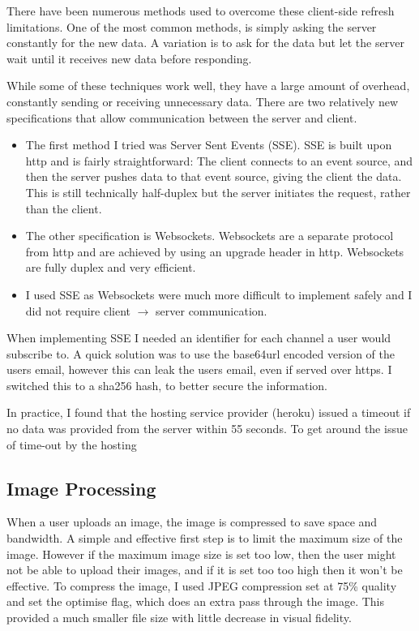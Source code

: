\documentclass[a4paper,oneside,12pt]{report}
\begin{document}
	There have been numerous methods used to overcome these client-side refresh limitations. One of the most common methods, is simply asking the server constantly for the new data. A variation is to ask for the data but let the server wait until it receives new data before responding. 
	
	While some of these techniques work well, they have a large amount of overhead, constantly sending or receiving unnecessary data. There are two relatively new specifications that allow communication between the server and client. 

	\begin{itemize}
		\item The first method I tried was Server Sent Events (SSE). SSE is built upon http and is fairly straightforward: The client connects to an event source, and then the server pushes data to that event source, giving the client the data. This is still technically half-duplex but the server initiates the request, rather than the client.
		\item The other specification is Websockets. Websockets are a separate protocol from http and are achieved by using an upgrade header in http. Websockets are fully duplex and very efficient.
		\item I used SSE as Websockets were much more difficult to implement safely and I did not require client \(\rightarrow\) server communication.
	\end{itemize}

	When implementing SSE I needed an identifier for each channel a user would subscribe to. A quick solution was to use the base64url encoded version of the users email, however this can leak the users email, even if served over https. I switched this to a sha256 hash, to better secure the information.
	
	In practice, I found that the hosting service provider (heroku) issued a timeout if no data was provided from the server within 55 seconds. To get around the issue of time-out by the hosting

	\subsection{Image Processing}
	When a user uploads an image, the image is compressed to save space and bandwidth. A simple and effective first step is to limit the maximum size of the image. However if the maximum image size is set too low, then the user might not be able to upload their images, and if it is set too too high then it won't be effective. To compress the image, I used JPEG compression set at 75\% quality and set the optimise flag, which does an extra pass through the image. This provided a much smaller file size with little decrease in visual fidelity. 
	
\end{document}
